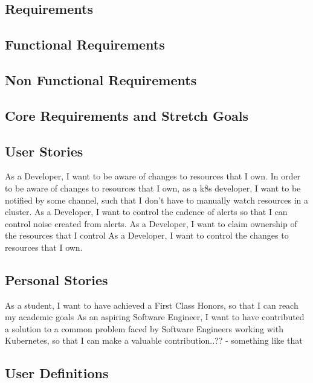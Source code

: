 \documentclass{article}
\begin{document}
\subsection{Requirements}



\subsection{Functional Requirements}



\subsection{Non Functional Requirements}



\subsection{Core Requirements and Stretch Goals}



\subsection{User Stories}
As a Developer, I want to be aware of changes to resources that I own.
In order to be aware of changes to resources that I own, as a k8s developer, I want to be notified by some channel, such that I don’t have to manually watch resources in a cluster.
As a Developer, I want to control the cadence of alerts so that I can control noise created from alerts.
As a Developer, I want to claim ownership of the resources that I control
As a Developer, I want to control the changes to resources that I own.


\subsection{Personal Stories}
As a student, I want to have achieved a First Class Honors, so that I can reach my academic goals
As an aspiring Software Engineer, I want to have contributed a solution to a common problem faced by Software Engineers working with Kubernetes, so that I can make a valuable contribution..?? - something like that



\subsection{User Definitions}
\end{document}
